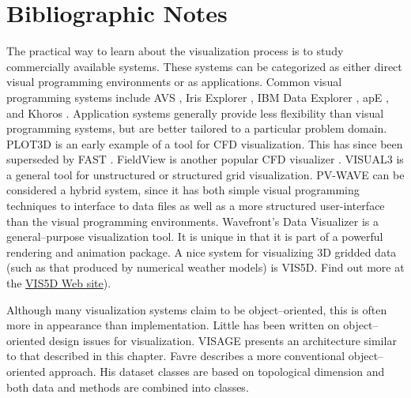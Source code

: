 \section{Bibliographic Notes}

The practical way to learn about the visualization process is to study commercially available systems. These systems can be categorized as either direct visual programming environments or as applications. Common visual programming systems include AVS \cite{AVS89}, Iris Explorer \cite{IrisExplorer}, IBM Data Explorer \cite{DataExplorer}, apE \cite{apE90}, and Khoros \cite{Rasure91}. Application systems generally provide less flexibility than visual programming systems, but are better tailored to a particular problem domain. PLOT3D \cite{PLOT3D} is an early example of a tool for CFD visualization. This has since been superseded by FAST \cite{FAST90}. FieldView is another popular CFD visualizer \cite{FieldView91}. VISUAL3 \cite{VISUAL3} is a general tool for unstructured or structured grid visualization. PV-WAVE \cite{Charal90} can be considered a hybrid system, since it has both simple visual programming techniques to interface to data files as well as a more structured user-interface than the visual programming environments. Wavefront's Data Visualizer \cite{DataVisualizer} is a general--purpose visualization tool. It is unique in that it is part of a powerful rendering and animation package. A nice system for visualizing 3D gridded data (such as that produced by numerical weather models) is VIS5D. Find out more at the \href{http://www.ssec.wisc.edu/\~billh/vis5d.html}{VIS5D Web site}).

Although many visualization systems claim to be object--oriented, this is often more in appearance than implementation. Little has been written on object--oriented design issues for visualization. VISAGE \cite{VISAGE92} presents an architecture similar to that described in this chapter. Favre \cite{Favre94} describes a more conventional object--oriented approach. His dataset classes are based on topological dimension and both data and methods are combined into classes.

